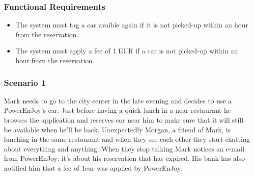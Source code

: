 \subsubsection{Functional Requirements}
\begin{itemize}
  \item The system must tag a car avaible again if it is not picked-up within an hour from the reservation.
  \item The system must apply a fee of 1 EUR if a car is not picked-up within an hour from the reservation.
\end{itemize}

\subsubsection{Scenario 1}
Mark needs to go to the city center in the late evening and decides to use a PowerEnJoy's car. Just before having a quick lunch in a near restaurant he browses the application and reserves car near him to make sure that it will still be available when he'll be back.
Unexpectedly Morgan, a friend of Mark, is lunching in the same restaurant and when they see each other they start chatting about everything and anything. When they stop talking Mark notices an e-mail from PowerEnJoy: it's about his reservation that has expired. His bank has also notified him that a fee of 1eur was applied by PowerEnJoy.


